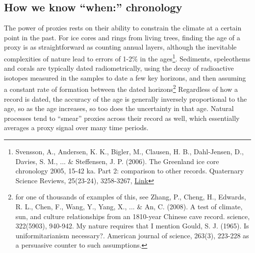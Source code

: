 \subsection{How we know ``when:'' chronology}
The power of proxies rests on their ability to constrain the climate at a certain point in the past. For ice cores and rings from living trees, finding the age of a proxy is as straightforward as counting annual layers, although the inevitable complexities of nature lead to errors of 1-2\% in the ages\footnote{Svensson, A., Andersen, K. K., Bigler, M., Clausen, H. B., Dahl-Jensen, D., Davies, S. M., ... \& Steffensen, J. P. (2006). The Greenland ice core chronology 2005, 15-42 ka. Part 2: comparison to other records. Quaternary Science Reviews, 25(23-24), 3258-3267, \href{https://pdfs.semanticscholar.org/273c/c5454f8f3fef1e698bb3d1da55fff48ccc42.pdf}{Link}}. Sediments, speleothems and corals are typically dated radiometrically, using the decay of radioactive isotopes measured in the samples to date a few key horizons, and then assuming a constant rate of formation between the dated horizons\footnote{for one of thousands of examples of this, see Zhang, P., Cheng, H., Edwards, R. L., Chen, F., Wang, Y., Yang, X., ... \& An, C. (2008). A test of climate, sun, and culture relationships from an 1810-year Chinese cave record. science, 322(5903), 940-942. My nature requires that I mention Gould, S. J. (1965). Is uniformitarianism necessary?. American journal of science, 263(3), 223-228 as a persuasive counter to such assumptions.} Regardless of how a record is dated, the accuracy of the age is generally inversely proportional to the age, so as the age increases, so too does the uncertainty in that age. Natural processes tend to ``smear'' proxies across their record as well, which essentially averages a proxy signal over many time periods.\\     
